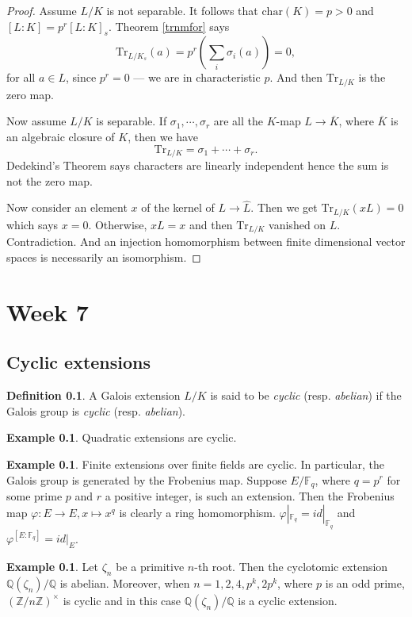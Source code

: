 \documentclass[12pt]{report}
\theoremstyle{definition}
\newtheorem{definition}[theorem]{Definition}
\newtheorem{example}[theorem]{Example}
\newcommand{\ff}{\mathbb{F}}
\newcommand{\charr}{\text{char}}
\newcommand{\ok}{\overline{K}}
\newcommand{\ZZ}{\mathbb{Z}}
\newcommand{\QQ}{\mathbb{Q}}
\newcommand{\Tr}{\text{Tr}}
\begin{document}
\begin{proof}
	Assume $L/K$ is not separable. It follows that $\charr(K)=p>0$ and $[L:K]=p^r[L:K]_s$. Theorem \ref{trnmfor} says $$\Tr_{L/K_s}(a)=p^r(\sum_i \sigma_i(a))=0,$$ for all $a\in L$, since $p^r=0$ --- we are in characteristic $p$. And then $\Tr_{L/K}$ is the zero map.



	Now assume $L/K$ is separable. If $\sigma_1,\cdots,\sigma_r$ are all the $K$-map $L\to\overline{K}$, where $\ok$ is an algebraic closure of $K$, then we have $$\Tr_{L/K}=\sigma_1+\cdots+\sigma_r.$$ Dedekind's Theorem says characters are linearly independent hence the sum is not the zero map.


	Now consider an element $x$ of the kernel of $L\to \hat{L}$. Then we get $\Tr_{L/K}(xL)=0$ which says $x=0$. Otherwise, $xL=x$ and then $\Tr_{L/K}$ vanished on $L$. Contradiction. And an injection homomorphism between finite dimensional vector spaces is necessarily an isomorphism.
\end{proof}

\chapter*{Week 7}
\setcounter{chapter}{7}

\section{Cyclic extensions}

\begin{definition}
	A Galois extension $L/K$ is said to be \emph{cyclic} (resp. \emph{abelian}) if the Galois group is \emph{cyclic} (resp. \emph{abelian}).
\end{definition}

\begin{example}
	Quadratic extensions are cyclic.
\end{example}

\begin{example}
	Finite extensions over finite fields are cyclic. In particular, the Galois group is generated by the Frobenius map. Suppose $E/\ff_q$, where $q=p^r$ for some prime $p$ and $r$ a positive integer, is such an extension. Then the Frobenius map $\varphi: E\to E, x\mapsto x^q$ is clearly a ring homomorphism. $\varphi|_{\ff_q}=id|_{\ff_q}$ and $\varphi^{[E:\ff_{q}]}=id|_{E}$.
\end{example}

\begin{example}
	Let $\zeta_n$ be a primitive $n$-th root. Then the cyclotomic extension $\QQ(\zeta_n)/\QQ$ is abelian. Moreover, when $n=1,2,4,p^k,2p^k$, where $p$ is an odd prime, $(\ZZ/n\ZZ)^\times$ is cyclic and in this case $\QQ(\zeta_n)/\QQ$ is a cyclic extension.
\end{example}
\end{document}
